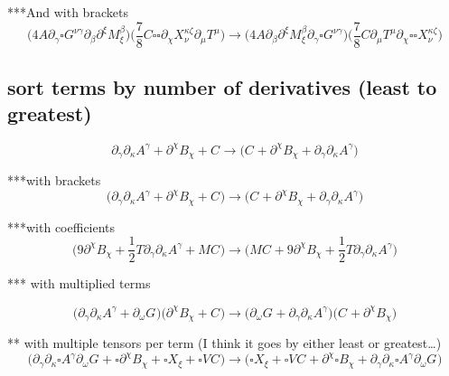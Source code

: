 \documentclass{article}
\def\){\Big)}
\def\({\Big(}
\begin{document}
***And with brackets 
\begin{equation}
\( 4A\partial_{\gamma} \square G^{\nu \gamma} \partial_{\beta}\partial^{\xi} M^{\beta}_{\xi}\)\(
  \frac{7}{8} C \square \square \partial_{\chi} X^{\kappa \zeta}_{\nu}  \partial_{\mu}T^{\mu} \) \rightarrow 
\(4 A \partial_{\beta}\partial^{\xi}M_{\xi}^{\beta} \partial_{\gamma}\square G^{\nu \gamma} \)\(\frac{7}{8} C \partial_{\mu}T^{\mu} \partial_{\chi}\square \square X_{\nu}^{\kappa \zeta} \)
 \end{equation}



 \subsection{sort terms by number of derivatives (least to greatest)}

\begin{equation}
\partial_{\gamma} \partial_{\kappa}A^{\gamma} + \partial^{\chi}B_{\chi} + C^{} \rightarrow 
\( C^{} + \partial^{\chi}B_{\chi} + \partial_{\gamma}\partial_{\kappa}A^{\gamma} \)
\end{equation}

***with brackets
\begin{equation}
\(\partial_{\gamma} \partial_{\kappa}A^{\gamma} + \partial^{\chi}B_{\chi} + C^{}\)  \rightarrow 
\( C^{} + \partial^{\chi}B_{\chi} + \partial_{\gamma}\partial_{\kappa}A^{\gamma} \)
\end{equation}

***with coefficients
\begin{equation}
\(  9\partial^{\chi}B_{\chi} +\frac{1}{2}T \partial_{\gamma}\partial_{\kappa}A^{\gamma} +M C^{} \) \rightarrow 
\(M C^{} +9 \partial^{\chi}B_{\chi} +\frac{1}{2} T \partial_{\gamma}\partial_{\kappa}A^{\gamma} \)
\end{equation}

*** with multiplied terms

\begin{equation}
\(\partial_{\gamma} \partial_{\kappa}A^{\gamma}  + \partial_{\omega}G^{} \)\( \partial^{\chi}B_{\chi} + C^{} \) \rightarrow 
\( \partial_{\omega}G^{} + \partial_{\gamma}\partial_{\kappa}A^{\gamma} \)\( C^{} + \partial^{\chi}B_{\chi} \)
\end{equation}

** with multiple tensors per term (I think it goes by either least or greatest…)\\

\begin{equation}
\(\partial_{\gamma} \partial_{\kappa}\square A^{\gamma}\partial_{\omega}G^{} + \square \partial^{\chi}B_{\chi} + \square X_{\xi}+ \square V_{}C^{} \) \rightarrow 
\( \square X_{\xi} + \square V^{} C^{} + \partial^{\chi}\square B_{\chi} + \partial_{\gamma}\partial_{\kappa}\square A^{\gamma} \partial_{\omega}G^{} \)
\end{equation}
\end{document}
